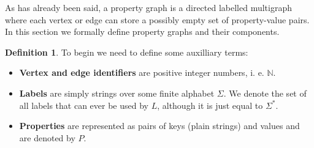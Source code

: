 \documentclass[14pt]{constructor-thesis}
\theoremstyle{definition}
\newtheorem{definition}{Definition}
\begin{document}
As has already been said, a property graph is a directed labelled multigraph where each vertex or edge can store a possibly empty set of property-value pairs. In this section we formally define property graphs and their components.

\begin{definition}
  To begin we need to define some auxilliary terms: 
  \begin{itemize}
    \item \textbf{Vertex and edge identifiers} are positive integer numbers, i. e. $\mathbb{N}$.
    \item \textbf{Labels} are simply strings over some finite alphabet $\Sigma$. We denote the set of all labels that can ever be used by $L$, although it is just equal to $\Sigma^*$.
    \item \textbf{Properties} are represented as pairs of keys (plain strings) and values and are denoted by $P$.
  \end{itemize}
\end{definition}
\end{document}
